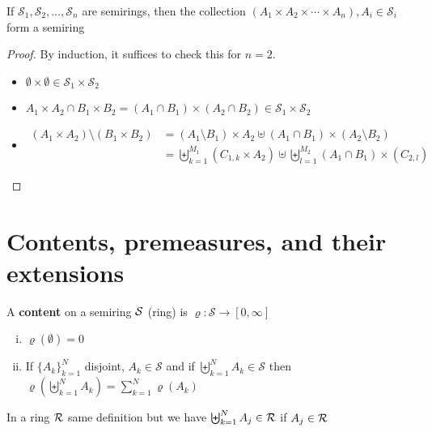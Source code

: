 \begin{lemma}
  If $\mathcal{S}_1, \mathcal{S}_2, \dotsc, \mathcal{S}_n$ are semirings, then 
  the collection $(A_1 \times A_2 \times \dotsm \times A_n), A_i \in \mathcal{S}_i$
  form a semiring
\end{lemma}

\begin{proof}
  By induction, it suffices to check this for $n = 2$.
  \begin{itemize}
    \item $\emptyset \times \emptyset \in \mathcal{S}_1 \times \mathcal{S}_2$
    \item $A_1 \times A_2 \cap B_1 \times B_2 = (A_1 \cap B_1) \times (A_2 \cap B_2) \in \mathcal{S}_1 \times \mathcal{S}_2$
    \item \begin{align*}
      (A_1 \times A_2) \setminus (B_1 \times B_2) &= (A_1 \setminus B_1) \times A_2 \uplus (A_1 \cap B_1) \times (A_2 \setminus B_2) \\
      &= \biguplus_{k=1}^{M_1} (C_{1, k} \times A_2) \uplus \biguplus_{l=1}^{M_2} (A_1 \cap B_1) \times (C_{2, l})
    \end{align*}
  \end{itemize}
\end{proof}

\section{Contents, premeasures, and their extensions}

\begin{definition}
  A \textbf{content} on a semiring $\mathcal S$ (ring) is 
  $\varrho : \mathcal{S} \to [0, \infty]$
  \begin{enumerate}[(i)]
    \item $\varrho(\emptyset) = 0$
    \item If $\{A_k\}_{k=1}^N$ disjoint, $A_k \in \mathcal{S}$ and if $\biguplus_{k=1}^N A_k \in \mathcal{S}$ then 
      $\varrho\left(\biguplus_{k=1}^N A_k\right) = \sum_{k=1}^N \varrho(A_k)$
  \end{enumerate}
\end{definition}

\begin{remark}
  In a ring $\mathcal R$ same definition but we have $\biguplus_{k=1}^N A_j \in \mathcal R$ if $A_j \in \mathcal R$
\end{remark}


